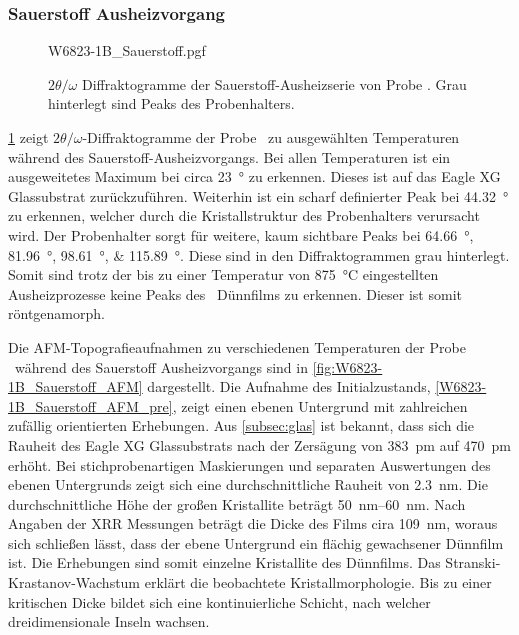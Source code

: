 \subsubsection{Sauerstoff Ausheizvorgang}\label{subsubsec:W6823-1B_Sauerstoff}
\begin{figure}
    \centering
    {W6823-1B_Sauerstoff.pgf}
    \caption{$2\theta/\omega$ Diffraktogramme der Sauerstoff-Ausheizserie von Probe \samplethree.
    Grau hinterlegt sind Peaks des Probenhalters.}
    \label{fig:W6823-1B_Sauerstoff_XRD}
\end{figure}
\cref{fig:W6823-1B_Sauerstoff_XRD} zeigt $2\theta/\omega$-Diffraktogramme der Probe \samplethree\ zu ausgewählten
Temperaturen während des Sauerstoff-Ausheizvorgangs.
Bei allen Temperaturen ist ein ausgeweitetes Maximum bei circa \qty{23}{\degree} zu erkennen.
Dieses ist auf das Eagle XG Glassubstrat zurückzuführen.
Weiterhin ist ein scharf definierter Peak bei \qty{44.32}{\degree} zu erkennen, welcher durch die
Kristallstruktur des Probenhalters verursacht wird.
Der Probenhalter sorgt für weitere, kaum sichtbare Peaks bei \qtylist{64.66; 81.96; 98.61; 115.89}{\degree}.
Diese sind in den Diffraktogrammen grau hinterlegt.
Somit sind trotz der bis zu einer Temperatur von \qty{875}{\degreeCelsius} eingestellten Ausheizprozesse keine Peaks
des \heo\ Dünnfilms zu erkennen.
Dieser ist somit röntgenamorph.

Die AFM-Topografieaufnahmen zu verschiedenen Temperaturen der Probe \samplethree\ während des Sauerstoff Ausheizvorgangs
sind in \cref{fig:W6823-1B_Sauerstoff_AFM} dargestellt.
Die Aufnahme des Initialzustands, \cref{W6823-1B_Sauerstoff_AFM_pre}, zeigt einen ebenen Untergrund mit zahlreichen
zufällig orientierten Erhebungen.
Aus \cref{subsec:glas} ist bekannt, dass sich die Rauheit des Eagle XG Glassubstrats nach der Zersägung von
\qty{383}{\pico\meter} auf \qty{470}{\pico\meter} erhöht.
Bei stichprobenartigen Maskierungen und separaten Auswertungen des ebenen Untergrunds zeigt sich eine durchschnittliche
Rauheit von \qty{2.3}{\nano\meter}.
Die durchschnittliche Höhe der großen Kristallite beträgt \qtyrange{50}{60}{\nano\meter}.
Nach Angaben der XRR Messungen beträgt die Dicke des Films cira \qty{109}{\nano\meter}, woraus sich schließen lässt,
dass der ebene Untergrund ein flächig gewachsener Dünnfilm ist.
Die Erhebungen sind somit einzelne Kristallite des Dünnfilms.
Das Stranski-Krastanov-Wachstum erklärt die beobachtete Kristallmorphologie.
Bis zu einer kritischen Dicke bildet sich eine kontinuierliche Schicht, nach welcher dreidimensionale Inseln wachsen.

